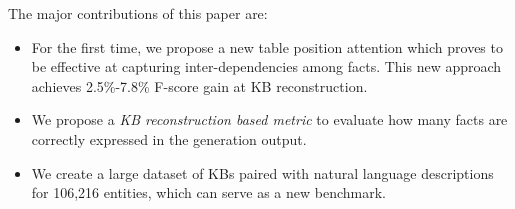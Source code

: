 \documentclass[11pt,a4paper]{article}
\begin{document}
The major contributions of this paper are: \begin{itemize}
\item For the first time, we propose a new table position attention which proves to be effective at capturing inter-dependencies among facts. This new approach achieves 2.5\%-7.8\% F-score gain at KB reconstruction.
\item We propose a \emph{KB reconstruction based metric} to evaluate how many facts are correctly expressed in the generation output. 
\item We create a large dataset of KBs paired with natural language descriptions for 106,216 entities, which can serve as a new benchmark.  \end{itemize}
\end{document}
